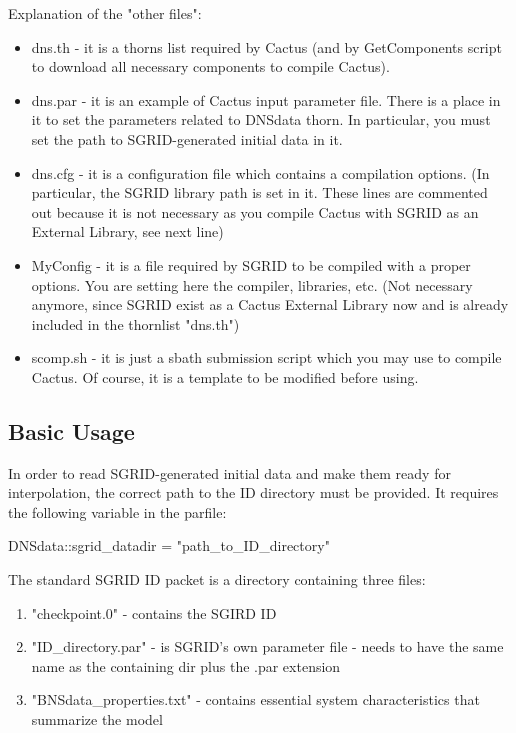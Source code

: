 Explanation of the "other files":

\begin{itemize}
\item dns.th - it is a thorns list required by Cactus (and by GetComponents script to download all necessary components to compile Cactus).
\item dns.par - it is an example of Cactus input parameter file. There is a place in it to set the parameters related to DNSdata thorn. In particular, you must set the path to SGRID-generated initial data in it.
\item dns.cfg - it is a configuration file which contains a compilation options. (In particular, the SGRID library path is set in it. These lines are commented out because it is not necessary as you compile Cactus with SGRID as an External Library, see next line)
\item MyConfig  - it is a file required by SGRID to be compiled with a proper options. You are setting here the compiler, libraries, etc. (Not necessary anymore, since SGRID exist as a Cactus External Library now and is already included in the thornlist "dns.th")
\item scomp.sh - it is just a sbath submission script which you may use to compile Cactus. Of course, it is a template to be modified before using.
\end{itemize}

\subsection{Basic Usage}

In order to read SGRID-generated initial data and make them ready for
interpolation, the correct path to the ID directory must be provided. It
requires the following variable in the parfile:

DNSdata::sgrid\_datadir = "path\_to\_ID\_directory"

The standard SGRID ID packet is a directory containing three files:
\begin{enumerate}
\item "checkpoint.0" - contains the SGIRD ID
\item "ID\_directory.par" - is SGRID's own parameter file - needs to have the same name as the containing dir plus the .par extension
\item "BNSdata\_properties.txt" - contains essential system characteristics that summarize the model
\end{enumerate}

